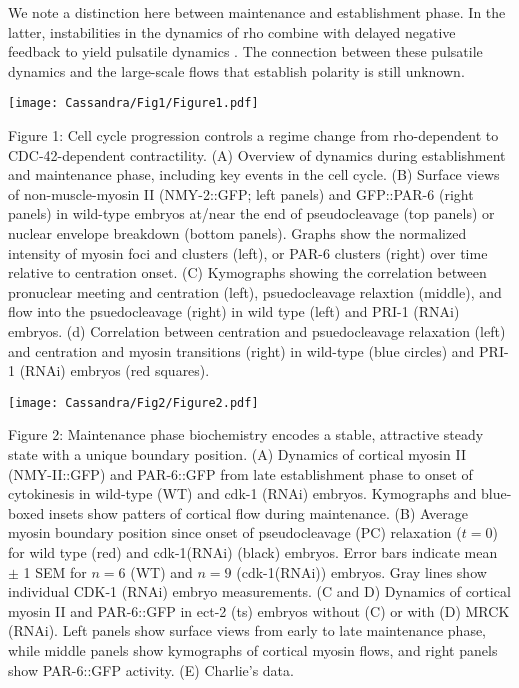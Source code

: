 \documentclass[11pt]{article}
\newcommand{\6}[1]{#1_{\text{6}}}
\newcommand{\3}[1]{#1_{\text{3}}}
\begin{document}
We note a distinction here between maintenance and establishment phase. In the latter, instabilities in the dynamics of rho combine with delayed negative feedback to yield pulsatile dynamics \citep{nishikawa2017controlling, michaux2018excitable, michaud2022versatile}. The connection between these pulsatile dynamics and the large-scale flows that establish polarity is still unknown.

\newpage 
\begin{center}
\texttt{[image: Cassandra/Fig1/Figure1.pdf]}
\end{center}

\newpage 
Figure 1: Cell cycle progression controls a regime change from rho-dependent to CDC-42-dependent contractility. (A) Overview of dynamics during establishment and maintenance phase, including key events in the cell cycle. (B) Surface views of non-muscle-myosin II (NMY-2::GFP; left panels) and GFP::PAR-6 (right panels) in wild-type embryos at/near the end of pseudocleavage (top panels) or nuclear envelope breakdown (bottom panels). Graphs show the normalized intensity of myosin foci and clusters (left), or PAR-6 clusters (right) over time relative to centration onset. (C) Kymographs showing the correlation between pronuclear meeting and centration (left), psuedocleavage relaxtion (middle), and flow into the psuedocleavage (right) in wild type (left) and PRI-1 (RNAi) embryos. (d) Correlation between centration and psuedocleavage relaxation (left) and centration and myosin transitions (right) in wild-type (blue circles) and PRI-1 (RNAi) embryos (red squares).

\newpage 
\begin{center}
\texttt{[image: Cassandra/Fig2/Figure2.pdf]}
\end{center}


\newpage
Figure 2: Maintenance phase biochemistry encodes a stable, attractive steady state with a unique boundary position. (A) Dynamics of cortical myosin II (NMY-II::GFP) and PAR-6::GFP from late establishment phase to onset of cytokinesis in wild-type (WT) and cdk-1 (RNAi) embryos. Kymographs and blue-boxed insets show patters of cortical flow during maintenance. (B) Average myosin boundary position since onset of pseudocleavage (PC) relaxation ($t=0$) for wild type (red) and cdk-1(RNAi) (black) embryos. Error bars indicate mean $\pm$ 1 SEM for $n=6$ (WT) and $n=9$ (cdk-1(RNAi)) embryos. Gray lines show individual CDK-1 (RNAi) embryo measurements. (C and D) Dynamics of cortical myosin II and PAR-6::GFP in ect-2 (ts) embryos without (C) or with (D) MRCK (RNAi). Left panels show surface views from early to late maintenance phase, while middle panels show kymographs of cortical myosin flows, and right panels show PAR-6::GFP activity. (E) Charlie's data.
\end{document}
